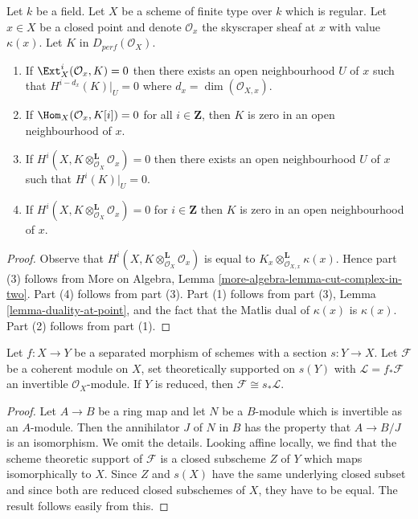 \begin{lemma}
\label{lemma-orthogonal-point-sheaf}
Let $k$ be a field. Let $X$ be a scheme of finite type over $k$ which
is regular. Let $x \in X$ be a closed point and denote $\mathcal{O}_x$
the skyscraper sheaf at $x$ with value $\kappa(x)$. Let $K$ in
$D_{perf}(\mathcal{O}_X)$.
\begin{enumerate}
\item If $\Ext^i_X(\mathcal{O}_x, K) = 0$ then there exists an open
neighbourhood $U$ of $x$ such that $H^{i - d_x}(K)|_U = 0$ where
$d_x = \dim(\mathcal{O}_{X, x})$.
\item If $\Hom_X(\mathcal{O}_x, K[i]) = 0$ for all
$i \in \mathbf{Z}$, then $K$ is zero in an open neighbourhood of $x$.
\item If $H^i(X, K \otimes_{\mathcal{O}_X}^\mathbf{L} \mathcal{O}_x) = 0$
then there exists an open neighbourhood $U$ of $x$ such that
$H^i(K)|_U = 0$.
\item If $H^i(X, K \otimes_{\mathcal{O}_X}^\mathbf{L} \mathcal{O}_x) = 0$
for $i \in \mathbf{Z}$ then $K$ is zero in an
open neighbourhood of $x$.
\end{enumerate}
\end{lemma}

\begin{proof}
Observe that $H^i(X, K \otimes_{\mathcal{O}_X}^\mathbf{L} \mathcal{O}_x)$
is equal to $K_x  \otimes_{\mathcal{O}_{X, x}}^\mathbf{L} \kappa(x)$.
Hence part (3) follows from More on Algebra, Lemma
\ref{more-algebra-lemma-cut-complex-in-two}.
Part (4) follows from part (3).
Part (1) follows from part (3), Lemma \ref{lemma-duality-at-point}, and the
fact that the Matlis dual of $\kappa(x)$ is $\kappa(x)$.
Part (2) follows from part (1).
\end{proof}

\begin{lemma}
\label{lemma-pushforward-invertible}
Let $f : X \to Y$ be a separated morphism of schemes with a section
$s : Y \to X$. Let $\mathcal{F}$ be a coherent module on $X$, set
theoretically supported on $s(Y)$ with $\mathcal{L} = f_*\mathcal{F}$
an invertible $\mathcal{O}_X$-module. If $Y$ is reduced, then
$\mathcal{F} \cong s_*\mathcal{L}$.
\end{lemma}

\begin{proof}
Let $A \to B$ be a ring map and let $N$ be a $B$-module which is
invertible as an $A$-module. Then the annihilator $J$ of $N$ in $B$
has the property that $A \to B/J$ is an isomorphism. We omit the details.
Looking affine locally, we find that the scheme theoretic support of
$\mathcal{F}$ is a closed subscheme $Z$ of $Y$ which maps isomorphically
to $X$. Since $Z$ and $s(X)$ have the same underlying closed subset
and since both are reduced closed subschemes of $X$, they have to be equal.
The result follows easily from this.
\end{proof}

